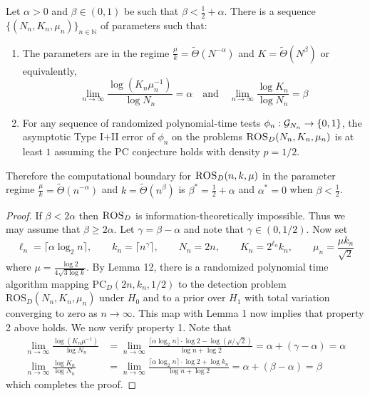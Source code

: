 \documentclass[11pt]{article}
\begin{document}
\begin{theorem}
Let $\alpha > 0$ and $\beta \in (0, 1)$ be such that $\beta < \frac{1}{2} + \alpha$. There is a sequence $\{ (N_n, K_n, \mu_n) \}_{n \in \mathbb{N}}$ of parameters such that:
\begin{enumerate}
\item The parameters are in the regime $\frac{\mu}{k} = \tilde{\Theta}(N^{-\alpha})$ and $K = \tilde{\Theta}(N^\beta)$ or equivalently,
$$\lim_{n \to \infty} \frac{\log (K_n \mu_n^{-1})}{\log N_n} = \alpha \quad \text{and} \quad \lim_{n \to \infty} \frac{\log K_n}{\log N_n} = \beta$$
\item For any sequence of randomized polynomial-time tests $\phi_n : \mathcal{G}_{N_n} \to \{0, 1\}$, the asymptotic Type I$+$II error of $\phi_n$ on the problems $\textsc{ROS}_D(N_n, K_n, \mu_n)$ is at least $1$ assuming the PC conjecture holds with density $p = 1/2$.
\end{enumerate}
Therefore the computational boundary for $\textsc{ROS}_D(n, k, \mu)$ in the parameter regime $\frac{\mu}{k} = \tilde{\Theta}(n^{-\alpha})$ and $k = \tilde{\Theta}(n^\beta)$ is $\beta^* = \frac{1}{2} + \alpha$ and $\alpha^* = 0$ when $\beta < \frac{1}{2}$.
\end{theorem}

\begin{proof}
If $\beta < 2\alpha$ then $\textsc{ROS}_D$ is information-theoretically impossible. Thus we may assume that $\beta \ge 2\alpha$. Let $\gamma = \beta - \alpha$ and note that $\gamma \in (0, 1/2)$. Now set
$$\ell_n = \lceil \alpha \log_2 n \rceil, \quad \quad k_n = \lceil n^{\gamma} \rceil, \quad \quad N_n = 2n, \quad \quad K_n = 2^{\ell_n} k_n, \quad \quad \mu_n =\frac{\mu k_n}{\sqrt{2}}$$
where $\mu = \frac{\log 2}{4 \sqrt{3 \log k}}$. By Lemma 12, there is a randomized polynomial time algorithm mapping $\text{PC}_D(2n, k_n, 1/2)$ to the detection problem $\text{ROS}_D(N_n, K_n, \mu_n)$ under $H_0$ and to a prior over $H_1$ with total variation converging to zero as $n \to \infty$. This map with Lemma 1 now implies that property 2 above holds. We now verify property 1. Note that
\begin{align*}
\lim_{n \to \infty} \frac{\log (K_n \mu^{-1})}{\log N_n} &= \lim_{n \to \infty} \frac{\lceil \alpha \log_2 n \rceil \cdot \log 2 - \log (\mu/\sqrt{2})}{\log n + \log 2} = \alpha + (\gamma - \alpha) = \alpha \\
\lim_{n \to \infty} \frac{\log K_n}{\log N_n} &= \lim_{n \to \infty} \frac{\lceil \alpha \log_2 n \rceil \cdot \log 2 + \log k_n}{\log n + \log 2} = \alpha + (\beta - \alpha) = \beta
\end{align*}
which completes the proof.
\end{proof}
\end{document}
